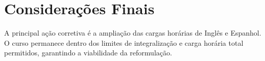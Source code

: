 \documentclass[a4paper,12pt]{article}
\begin{document}
\section{Considerações Finais}
A principal ação corretiva é a ampliação das cargas horárias de Inglês e Espanhol. O curso permanece dentro dos limites de integralização e carga horária total permitidos, garantindo a viabilidade da reformulação.
\end{document}
